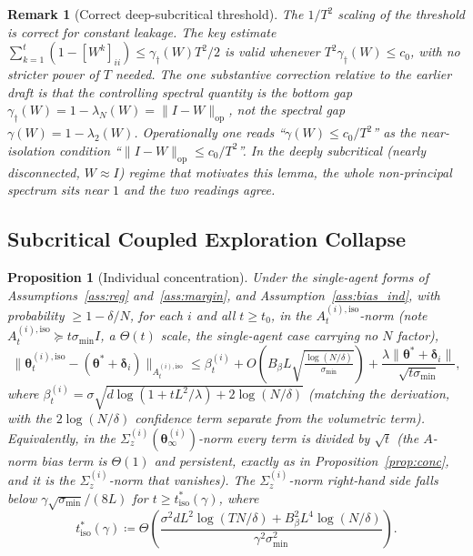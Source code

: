 \documentclass[11pt]{article}
\newtheorem{proposition}[theorem]{Proposition}
\newtheorem*{remark}{Remark}
\begin{document}
\begin{remark}[Correct deep-subcritical threshold]
The $1/T^2$ scaling of the threshold is correct for constant leakage.
The key estimate $\sum_{k=1}^t(1-[W^k]_{ii})\leq\gamma_\dagger(W)T^2/2$
is valid whenever $T^2\gamma_\dagger(W)\leq c_0$, with no stricter power
of $T$ needed.  The one substantive correction relative to the earlier
draft is that the controlling spectral quantity is the \emph{bottom}
gap $\gamma_\dagger(W)=1-\lambda_N(W)=\|I-W\|_{\mathrm{op}}$, not the
\emph{spectral} gap $\gamma(W)=1-\lambda_2(W)$.  Operationally one reads
``$\gamma(W)\leq c_0/T^2$'' as the near-isolation condition
``$\|I-W\|_{\mathrm{op}}\leq c_0/T^2$''. In the deeply subcritical
(nearly disconnected, $W\approx I$) regime that motivates this lemma,
the whole non-principal spectrum sits near $1$ and the two readings
agree.
\end{remark}

\subsection{Subcritical Coupled Exploration Collapse}

\begin{proposition}[Individual concentration]\label{prop:conc_ind}
Under the single-agent forms of Assumptions~\ref{ass:reg}
and~\ref{ass:margin}, and Assumption~\ref{ass:bias_ind},
with probability $\geq 1-\delta/N$, for each $i$ and all $t\geq t_0$,
in the $A_t^{(i),\mathrm{iso}}$-norm (note $A_t^{(i),\mathrm{iso}}\succeq t\sigma_{\min}I$,
a $\Theta(t)$ scale, the single-agent case carrying no $N$ factor),
\[
\|\bm{\theta}_t^{(i),\mathrm{iso}}-(\bm{\theta}^{\!*}+\bm{\delta}_i)\|_{A_t^{(i),\mathrm{iso}}}
\leq\beta_t^{(i)}
+O\!\left(B_\beta L\sqrt{\tfrac{\log(N/\delta)}{\sigma_{\min}}}\right)
+\frac{\lambda\|\bm{\theta}^{\!*}+\bm{\delta}_i\|}{\sqrt{t\sigma_{\min}}},
\]
where $\beta_t^{(i)}=\sigma\sqrt{d\log(1+tL^2/\lambda)+2\log(N/\delta)}$
(matching the derivation, with the $2\log(N/\delta)$ confidence term
separate from the volumetric term).  Equivalently, in the
$\Sigma_z^{(i)}(\bm{\theta}_\infty^{(i)})$-norm every term is divided by
$\sqrt t$ (the $A$-norm bias term is $\Theta(1)$ and persistent, exactly
as in Proposition~\ref{prop:conc}, and it is the $\Sigma_z^{(i)}$-norm that
vanishes).
The $\Sigma_z^{(i)}$-norm right-hand side falls below
$\gamma\sqrt{\sigma_{\min}}/(8L)$ for
$t\geq t_{\mathrm{iso}}^*(\gamma)$, where
\begin{equation}
t_{\mathrm{iso}}^*(\gamma)\coloneqq
\Theta\!\left(\frac{\sigma^2 dL^2\log(TN/\delta)+B_\beta^2 L^4\log(N/\delta)}
{\gamma^2\sigma_{\min}^2}\right).
\label{eq:tiso_star}
\end{equation}
\end{proposition}
\end{document}
